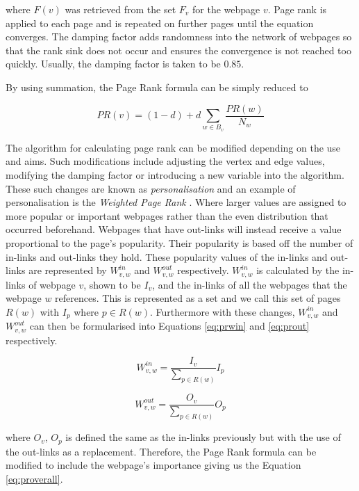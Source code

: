 where $F(v)$ was retrieved from the set $F_v$ for the webpage $v$. Page rank is applied to each page and is repeated on further pages until the equation converges. The damping factor adds randomness into the network of webpages so that the rank sink does not occur and ensures the convergence is not reached too quickly. Usually, the damping factor is taken to be $0.85$. 

By using summation, the Page Rank formula can be simply reduced to

\begin{equation}
PR(v) = (1 - d) + d\sum_{w \in B_v}\frac{PR(w)}{N_w}
\end{equation}

The algorithm for calculating page rank can be modified depending on the use and aims. Such modifications include adjusting the vertex and edge values, modifying the damping factor or introducing a new variable into the algorithm. These such changes are known as \emph{personalisation} and an example of personalisation is the \emph{Weighted Page Rank} \cite{xing2004weighted}. Where larger values are assigned to more popular or important webpages rather than the even distribution that occurred beforehand. Webpages that have out-links will instead receive a value proportional to the page's popularity. Their popularity is based off the number of in-links and out-links they hold. These popularity values of the in-links and out-links are represented by $W^{in}_{v,w}$ and $W^{out}_{v,w}$ respectively. $W^{in}_{v,w}$ is calculated by the in-links of webpage $v$, shown to be $I_v$, and the in-links of all the webpages that the webpage $w$ references. This is represented as a set and we call this set of pages $R(w)$ with $I_p$ where $p \in R(w)$. Furthermore with these changes, $W^{in}_{v,w}$ and $W^{out}_{v,w}$ can then be formularised into Equations \ref{eq:prwin} and \ref{eq:prout} respectively.

\begin{equation}\label{eq:prwin}
W^{in}_{v,w} = \frac{I_v}{\sum_{p \in R(w)}}{I_p}
\end{equation}

\begin{equation}\label{eq:prout}
W^{out}_{v,w} = \frac{O_v}{\sum_{p \in R(w)}}{O_p}
\end{equation}

where $O_v$, $O_p$ is defined the same as the in-links previously but with the use of the out-links as a replacement. Therefore, the Page Rank formula can be modified to include the webpage's importance giving us the Equation \ref{eq:proverall}.

